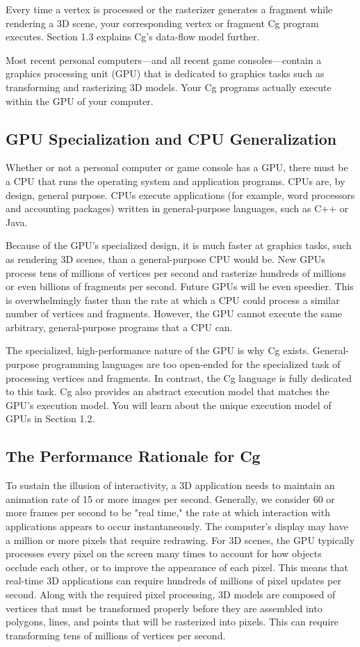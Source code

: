 \documentclass[../main.tex]{subfiles}
\begin{document}
Every time a vertex is processed or the rasterizer generates a fragment while rendering a 3D scene, your corresponding vertex or fragment Cg program executes. Section 1.3 explains Cg's data-flow model further.

Most recent personal computers—and all recent game consoles—contain a graphics processing unit (GPU) that is dedicated to graphics tasks such as transforming and rasterizing 3D models. Your Cg programs actually execute within the GPU of your computer.

\subsection{GPU Specialization and CPU Generalization}

Whether or not a personal computer or game console has a GPU, there must be a CPU that runs the operating system and application programs. CPUs are, by design, general purpose. CPUs execute applications (for example, word processors and accounting packages) written in general-purpose languages, such as C++ or Java.

Because of the GPU's specialized design, it is much faster at graphics tasks, such as rendering 3D scenes, than a general-purpose CPU would be. New GPUs process tens of millions of vertices per second and rasterize hundreds of millions or even billions of fragments per second. Future GPUs will be even speedier. This is overwhelmingly faster than the rate at which a CPU could process a similar number of vertices and fragments. However, the GPU cannot execute the same arbitrary, general-purpose programs that a CPU can.

The specialized, high-performance nature of the GPU is why Cg exists. General-purpose programming languages are too open-ended for the specialized task of processing vertices and fragments. In contrast, the Cg language is fully dedicated to this task. Cg also provides an abstract execution model that matches the GPU's execution model. You will learn about the unique execution model of GPUs in Section 1.2.

\subsection{The Performance Rationale for Cg}

To sustain the illusion of interactivity, a 3D application needs to maintain an animation rate of 15 or more images per second. Generally, we consider 60 or more frames per second to be "real time," the rate at which interaction with applications appears to occur instantaneously. The computer's display may have a million or more pixels that require redrawing. For 3D scenes, the GPU typically processes every pixel on the screen many times to account for how objects occlude each other, or to improve the appearance of each pixel. This means that real-time 3D applications can require hundreds of millions of pixel updates per second. Along with the required pixel processing, 3D models are composed of vertices that must be transformed properly before they are assembled into polygons, lines, and points that will be rasterized into pixels. This can require transforming tens of millions of vertices per second.
\end{document}

